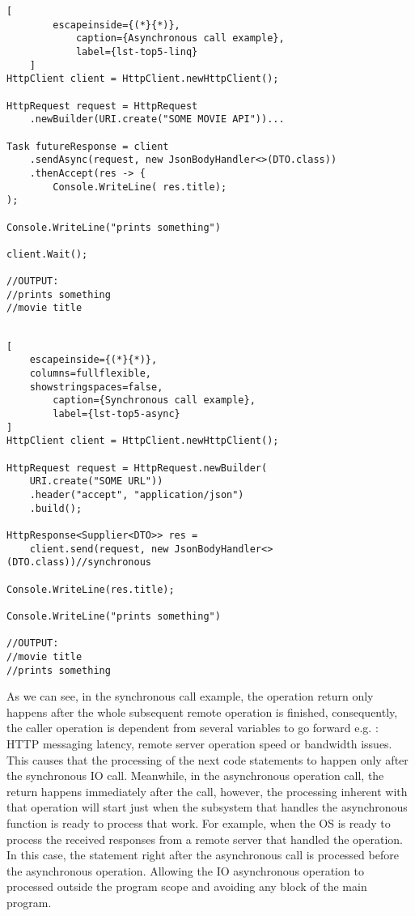\begin{center}
	\lstset{basicstyle=\scriptsize\ttfamily,frame=bottomline}
	\begin{minipage}{.48\textwidth}
	\begin{lstlisting}[
		escapeinside={(*}{*)},
			caption={Asynchronous call example},
			label={lst-top5-linq}
	]
HttpClient client = HttpClient.newHttpClient();

HttpRequest request = HttpRequest
	.newBuilder(URI.create("SOME MOVIE API"))...

Task futureResponse = client
	.sendAsync(request, new JsonBodyHandler<>(DTO.class)) 
	.thenAccept(res -> {
		Console.WriteLine( res.title);
); 

Console.WriteLine("prints something")

client.Wait();

//OUTPUT:
//prints something
//movie title
		
\end{lstlisting}
\end{minipage}
\hfill
\begin{minipage}{.48\textwidth}
\lstset{basicstyle=\scriptsize\ttfamily,frame=bottomline}
\begin{lstlisting}[
	escapeinside={(*}{*)},
	columns=fullflexible,
	showstringspaces=false,
		caption={Synchronous call example},
		label={lst-top5-async}
]
HttpClient client = HttpClient.newHttpClient();

HttpRequest request = HttpRequest.newBuilder(
	URI.create("SOME URL"))
	.header("accept", "application/json")
	.build();

HttpResponse<Supplier<DTO>> res = 
	client.send(request, new JsonBodyHandler<>(DTO.class))//synchronous

Console.WriteLine(res.title);

Console.WriteLine("prints something")

//OUTPUT:
//movie title
//prints something

		\end{lstlisting}
	\end{minipage}
\end{center}

	As we can see, in the synchronous call example, the operation return only happens after the whole subsequent remote operation is finished, consequently, the caller operation is dependent from several variables to go forward e.g. : HTTP messaging latency, remote server operation speed or bandwidth issues. 
	This causes that the processing of the next code statements to happen only after the synchronous IO call.
	Meanwhile, in the asynchronous operation call, the return happens immediately after the call, however, the processing inherent with that operation will start just when the subsystem that handles the asynchronous function is ready to process that work. For example, when the OS is ready to process the received responses from a remote server that handled the operation.
	In this case, the statement right after the asynchronous call is processed before the asynchronous operation. Allowing the IO asynchronous operation to processed outside the program scope and avoiding any block of the main program.

